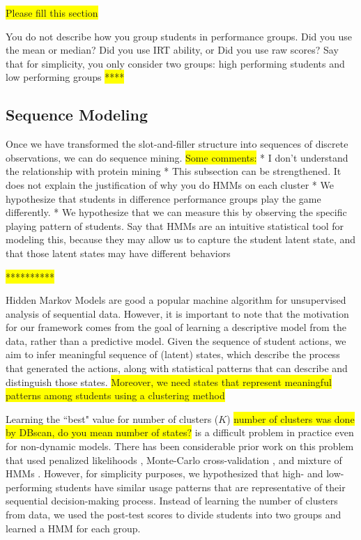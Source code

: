 \documentclass{sigchi}
\newcommand{\hl}[1]{\colorbox{yellow}{#1}}
\begin{document}
\hl{Please fill this section}

You do not describe how you group students in performance groups.
Did you use the mean or  median?  Did you use IRT ability, or Did you use raw scores?
Say that for simplicity, you only consider two groups: high performing students and low performing groups
\hl{****}


\subsection{Sequence Modeling}
Once we have transformed the slot-and-filler structure into sequences of discrete observations, we can do sequence mining.
\hl{Some comments:}
* I don't understand the relationship with protein mining
* This subsection can be strengthened. It does not explain the justification of  why you do HMMs on each cluster
* We hypothesize that students in difference performance groups play the game differently.
* We hypothesize that we can measure this by observing the specific playing pattern of students.
Say that HMMs are an intuitive statistical tool for modeling this, because they may allow us to capture the student latent state, and that those latent states may have different behaviors

\hl{**********}


Hidden Markov Models are good a popular machine algorithm for unsupervised analysis of sequential data.
However, it is important to note that the motivation for our framework comes from the goal of learning a descriptive model from the data, rather than a predictive model.
Given the sequence of student actions, we aim to infer meaningful sequence of (latent) states, which describe the process that generated the actions, along with statistical patterns that can describe and distinguish those states.
\hl{Moreover, we need states that represent meaningful patterns among students using a clustering method}

Learning the ``best" value for number of clusters ($K$)  \hl{number of clusters was done by DBscan, do you mean number of states?} is a difficult problem in practice even for non-dynamic models. 
There has been considerable prior work on this problem that used penalized likelihoods \cite{rabiner1989hmm}, Monte-Carlo cross-validation \cite{smyth1996clustering}, and mixture of HMMs \cite{smyth1997clustering}. 
However, for simplicity purposes, we hypothesized that high- and low-performing students have similar usage patterns that are representative of their sequential decision-making process. Instead of learning the number of clusters from data, we used the post-test scores to divide students into two groups and learned a HMM for each group.
\end{document}
